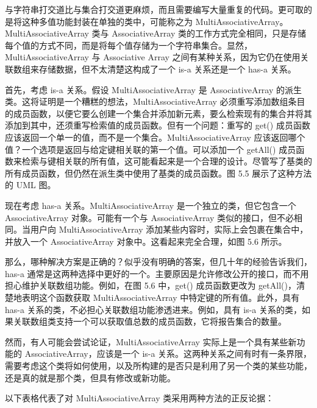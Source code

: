 与字符串打交道比与集合打交道更麻烦，而且需要编写大量重复的代码。更可取的是将这种多值功能封装在单独的类中，可能称之为 MultiAssociativeArray。MultiAssociativeArray 类与 AssociativeArray 类的工作方式完全相同，只是存储每个值的方式不同，而是将每个值存储为一个字符串集合。显然，MultiAssociativeArray 与 Associative Array 之间有某种关系，因为它仍在使用关联数组来存储数据，但不太清楚这构成了一个 is-a 关系还是一个 has-a 关系。

首先，考虑 is-a 关系。假设 MultiAssociativeArray 是 AssociativeArray 的派生类。这将证明是一个糟糕的想法，MultiAssociativeArray 必须重写添加数组条目的成员函数，以便它要么创建一个集合并添加新元素，要么检索现有的集合并将其添加到其中，还须重写检索值的成员函数。但有一个问题：重写的 get() 成员函数应该返回一个单一的值，而不是一个集合。MultiAssociativeArray 应该返回哪个值？一个选项是返回与给定键相关联的第一个值。可以添加一个 getAll() 成员函数来检索与键相关联的所有值，这可能看起来是一个合理的设计。尽管写了基类的所有成员函数，但仍然在派生类中使用了基类的成员函数。图 5.5 展示了这种方法的 UML 图。


现在考虑 has-a 关系。MultiAssociativeArray 是一个独立的类，但它包含一个 AssociativeArray 对象。可能有一个与 AssociativeArray 类似的接口，但不必相同。当用户向 MultiAssociativeArray 添加某些内容时，实际上会包裹在集合中，并放入一个 AssociativeArray 对象中。这看起来完全合理，如图 5.6 所示。


那么，哪种解决方案是正确的？似乎没有明确的答案，但几十年的经验告诉我们，has-a 通常是这两种选择中更好的一个。主要原因是允许修改公开的接口，而不用担心维护关联数组功能。例如，在图 5.6 中，get() 成员函数更改为 getAll()，清楚地表明这个函数获取 MultiAssociativeArray 中特定键的所有值。此外，具有 has-a 关系的类，不必担心关联数组功能渗透进来。例如，具有 is-a 关系的类，如果关联数组类支持一个可以获取值总数的成员函数，它将报告集合的数量。

然而，有人可能会尝试论证，MultiAssociativeArray 实际上是一个具有某些新功能的 AssociativeArray，应该是一个 is-a 关系。这两种关系之间有时有一条界限，需要考虑这个类将如何使用，以及所构建的是否只是利用了另一个类的某些功能，还是真的就是那个类，但具有修改或新功能。

以下表格代表了对 MultiAssociativeArray 类采用两种方法的正反论据：


